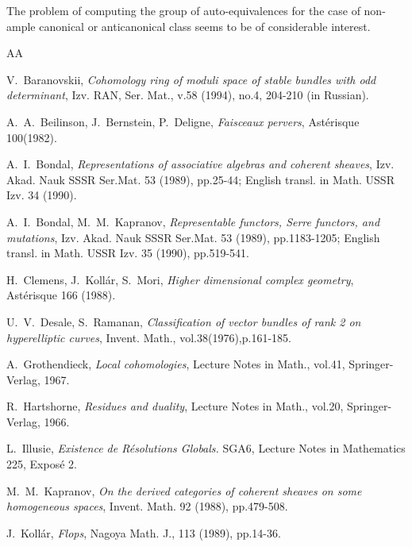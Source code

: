 \documentclass[12pt]{article}
\begin{document}
The problem of computing the group of auto-equivalences
for the case of non-ample canonical or anticanonical class
seems to be of considerable interest.

 













\begin{thebibliography}{AA}

 V.~Baranovskii, {\it Cohomology ring of moduli space of stable bundles with odd determinant}, Izv. RAN, Ser. Mat., v.58 (1994), no.4, 204-210 (in Russian).

 A.~A.~Beilinson, J.~Bernstein, P.~Deligne, {\it Faisceaux pervers}, Ast\'erisque 100(1982).

 A.~I.~Bondal, {\it Representations of associative algebras and coherent sheaves}, Izv. Akad. Nauk SSSR Ser.Mat. 53 (1989), pp.25-44; English transl. in Math. USSR Izv. 34 (1990).

 A.~I.~Bondal, M.~M.~Kapranov,  {\it Representable functors, Serre functors, and mutations}, Izv. Akad. Nauk SSSR Ser.Mat. 53 (1989), pp.1183-1205; English transl. in Math. USSR Izv. 35 (1990), pp.519-541.

 H.~Clemens, J.~Koll\'ar, S.~Mori, {\it Higher dimensional complex geometry}, Ast\'erisque 166 (1988).

 U.~V.~Desale, S.~Ramanan, {\it Classification of vector bundles of rank 2 on hyperelliptic curves}, Invent. Math., vol.38(1976),p.161-185.

 A.~Grothendieck, {\it Local cohomologies}, Lecture Notes in Math., vol.41, Springer-Verlag, 1967.

 R.~Hartshorne, {\it Residues and duality}, Lecture Notes in Math., vol.20, Springer-Verlag, 1966.

 L.~Illusie, {\it Existence de R\'esolutions Globals.} SGA6, Lecture Notes in Mathematics 225, Expos\'e 2.

  M.~M.~Kapranov,  {\it On the derived categories of coherent sheaves on some homogeneous spaces}, Invent. Math. 92 (1988), pp.479-508.

 J.~Koll\'ar, {\it Flops}, Nagoya Math. J., 113 (1989), pp.14-36.


\end{thebibliography}
\end{document}
